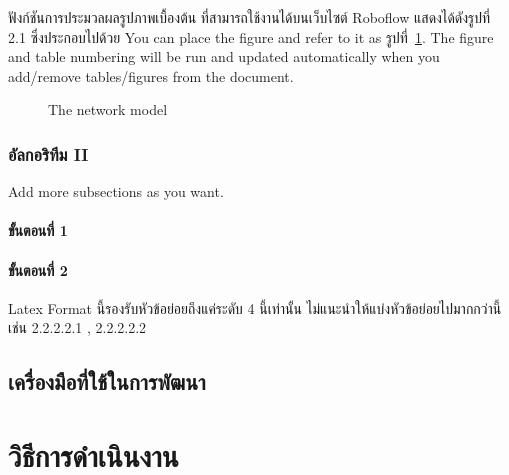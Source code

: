 \documentclass[12pt,oneside,openright,a4paper]{cpe-thai-project}
\begin{document}
	\hspace{2em} ฟังก์ชันการประมวลผลรูปภาพเบื้องต้น ที่สามารถใช้งานได้บนเว็บไซต์ Roboflow แสดงได้ดังรูปที่ 2.1 ซึ่งประกอบไปด้วย
You can place the figure and refer to it as รูปที่~\ref{fig:model2}.
The figure and table numbering will be run and updated automatically when you add/remove tables/figures from the document.

\begin{figure}[!h]\centering
\setlength{\fboxrule}{0.2mm} %
\setlength{\fboxsep}{1cm}
\caption{The network model}\label{fig:model2}
\end{figure}


 
\subsection{อัลกอริทึม II}
Add more subsections as you want.
\subsubsection{ขั้นตอนที่ 1}
\subsubsection{ขั้นตอนที่ 2}
Latex Format นี้รองรับหัวข้อย่อยถึงแค่ระดับ 4 นี้เท่านั้น ไม่แนะนำให้แบ่งหัวข้อย่อยไปมากกว่านี้ เช่น 2.2.2.2.1 , 2.2.2.2.2

\section{เครื่องมือที่ใช้ในการพัฒนา}

\chapter{วิธีการดำเนินงาน}
\end{document}

